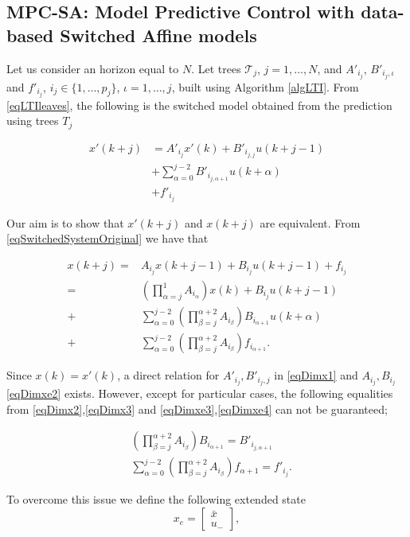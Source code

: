 \documentclass[letterpaper, 10 pt, conference]{ifacconf}  %
\begin{document}
\subsection{MPC-SA: Model Predictive Control with data-based Switched Affine models}\label{ssecMPC-SA}
Let us consider an horizon equal to $N$. Let trees $\mathcal{T}_j$, $j=1,\ldots,N$, and $A'_{i_j}$, $B'_{i_j,\iota}$ and $f'_{i_j}$, $i_j\in\{1,\ldots,p_j\}$, $\iota=1,\ldots,j$, built using Algorithm \ref{algLTI}. From \eqref{eqLTIleaves}, the following is the switched model obtained from the prediction using trees $T_j$

\begin{align}
x'(k+j) &= A'_{i_j}x'(k) + B'_{i_{j,j}}u(k+j-1)\label{eqDimx1}\\
&+\sum_{\alpha=0}^{j-2}{B'_{i_{j,\alpha+1}}u(k+\alpha)}\label{eqDimx2}\\
&+f'_{i_j}\label{eqDimx3}
\end{align}

Our aim is to show that $x'(k+j)$ and $x(k+j)$ are equivalent. From \eqref{eqSwitchedSystemOriginal} we have that

\begin{align}
x(k+j) = &A_{i_j}x(k+j-1) + B_{i_j}u(k+j-1) + f_{i_j}\label{eqDimxe1}\\
= &\left(\prod_{\alpha=j}^{1}{A_{i_\alpha}}\right)x(k) + B_{i_j}u(k+j-1)\label{eqDimxe2}\\
+&\sum_{\alpha=0}^{j-2}{\left(\prod_{\beta=j}^{\alpha + 2}{A_{i_\beta}}\right)B_{i_{\alpha+1}}u(k + \alpha)}\label{eqDimxe3}\\
+&\sum_{\alpha=0}^{j-2}{\left(\prod_{\beta=j}^{\alpha + 2}{A_{i_\beta}}\right)f_{i_{\alpha+1}}}\label{eqDimxe4}.
\end{align}

Since $x(k) = x'(k)$, a direct relation for $A'_{i_j},B'_{i_j,j}$ in \eqref{eqDimx1} and $A_{i_j},B_{i_j}$ \eqref{eqDimxe2} exists. However, except for particular cases, the following equalities from \eqref{eqDimx2},\eqref{eqDimx3} and \eqref{eqDimxe3},\eqref{eqDimxe4} can not be guaranteed;

\begin{align}
&\left(\prod_{\beta=j}^{\alpha + 2}{A_{i_\beta}}\right)B_{i_{\alpha+1}} = B'_{i_{j,\alpha+1}}\\
&\sum_{\alpha=0}^{j-2}{\left(\prod_{\beta=j}^{\alpha + 2}{A_{i_\beta}}\right)f_{\alpha+1}} = f'_{i_j}.
\end{align}

To overcome this issue we define the following extended state
\begin{equation}
x_e=\left[\begin{array}{l}
\bar x \\
u_{-}
\end{array}\right],
\end{equation}
\end{document}
